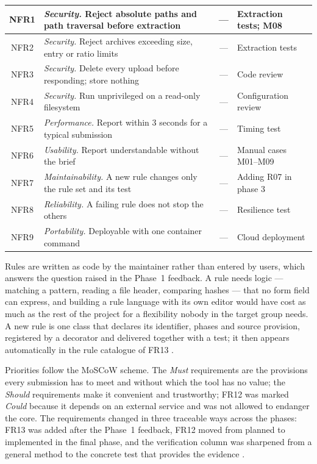 \documentclass[a4paper,11pt]{article}
\begin{document}
\begin{table}[H]
\begin{tabularx}{\textwidth}{|c|X|c|L{4.6cm}|}
\hline
NFR1 & \textit{Security.} Reject absolute paths and path traversal before extraction & --- & Extraction tests; M08 \\
\hline
NFR2 & \textit{Security.} Reject archives exceeding size, entry or ratio limits & --- & Extraction tests \\
\hline
NFR3 & \textit{Security.} Delete every upload before responding; store nothing & --- & Code review \\
\hline
NFR4 & \textit{Security.} Run unprivileged on a read-only filesystem & --- & Configuration review \\
\hline
NFR5 & \textit{Performance.} Report within 3 seconds for a typical submission & --- & Timing test \\
\hline
NFR6 & \textit{Usability.} Report understandable without the brief & --- & Manual cases M01--M09 \\
\hline
NFR7 & \textit{Maintainability.} A new rule changes only the rule set and its test & --- & Adding R07 in phase 3 \\
\hline
NFR8 & \textit{Reliability.} A failing rule does not stop the others & --- & Resilience test \\
\hline
NFR9 & \textit{Portability.} Deployable with one container command & --- & Cloud deployment \\
\hline
\end{tabularx}
\end{table}

Rules are written as code by the maintainer rather than entered by users, which
answers the question raised in the Phase~1 feedback. A rule needs logic ---
matching a pattern, reading a file header, comparing hashes --- that no form
field can express, and building a rule language with its own editor would have
cost as much as the rest of the project for a flexibility nobody in the target
group needs. A new rule is one class that declares its identifier, phases and
source provision, registered by a decorator and delivered together with a test;
it then appears automatically in the rule catalogue of FR13 \citep{Percival2020}.

Priorities follow the MoSCoW scheme. The \textit{Must} requirements are the
provisions every submission has to meet and without which the tool has no value;
the \textit{Should} requirements make it convenient and trustworthy; FR12 was
marked \textit{Could} because it depends on an external service and was not
allowed to endanger the core. The requirements changed in three traceable ways
across the phases: FR13 was added after the Phase~1 feedback, FR12 moved from
planned to implemented in the final phase, and the verification column was
sharpened from a general method to the concrete test that provides the evidence
\citep{Sommerville2020}.
\end{document}
